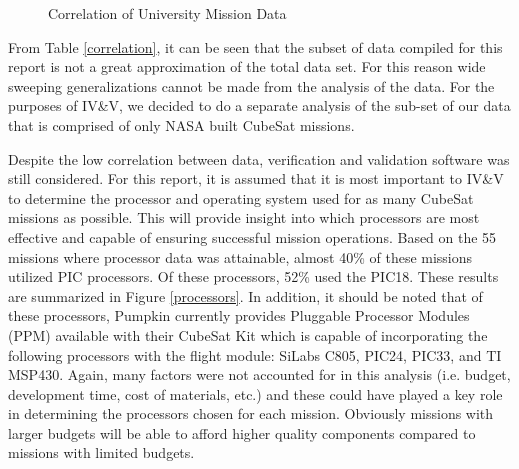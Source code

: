 \documentclass[11pt]{article}
\begin{document}
\begin{figure}[ht!]
\centering
{}
\caption{Correlation of University Mission Data}
\label{university}
\end{figure}

From Table \ref{correlation}, it can be seen that the subset of data compiled for this report is not a great approximation of the total data set.  For this reason wide sweeping generalizations cannot be made from the analysis of the data. For the purposes of IV\&V, we decided to do a separate analysis of the sub-set of our data that is comprised of only NASA built CubeSat missions. 

Despite the low correlation between data, verification and validation software was still considered.  For this report, it is assumed that it is most important to IV\&V to determine the processor and operating system used for as many CubeSat missions as possible.  This will provide insight into which processors are most effective and capable of ensuring successful mission operations.  Based on the 55 missions where processor data was attainable, almost 40\% of these missions utilized PIC processors.  Of these processors, 52\% used the PIC18.  These results are summarized in Figure \ref{processors}.  In addition, it should be noted that of these processors, Pumpkin currently provides Pluggable Processor Modules (PPM) available with their CubeSat Kit which is capable of incorporating the following processors with the flight module:  SiLabs C805, PIC24, PIC33, and TI MSP430.  Again, many factors were not accounted for in this analysis (i.e. budget, development time, cost of materials, etc.) and these could have played a key role in determining the processors chosen for each mission.  Obviously missions with larger budgets will be able to afford higher quality components compared to missions with limited budgets.
\end{document}

